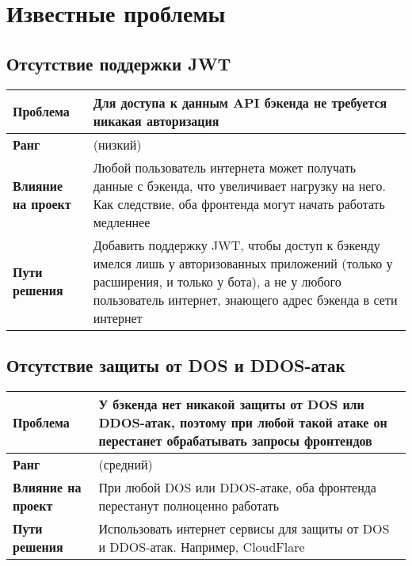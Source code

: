 \chapter{Известные проблемы}
	\label{chapter6}

	\section{Отсутствие поддержки JWT}
		\begin{tabularx}{\textwidth}{
				| >{\centering\arraybackslash\hsize=4cm}X
				| >{\centering\arraybackslash}X
				|}
			\hline
			\textbf{Проблема} &  Для доступа к данным API бэкенда не требуется никакая авторизация \\\hline
			\textbf{Ранг} &  3 (низкий) \\\hline
			\textbf{Влияние на проект} &  Любой пользователь интернета может получать данные с бэкенда, что увеличивает нагрузку на него. Как следствие, оба фронтенда могут начать работать медленнее \\\hline
			\textbf{Пути решения} &  Добавить поддержку JWT, чтобы доступ к бэкенду имелся лишь у авторизованных приложений (только у расширения, и только у бота), а не у любого пользователь интернет, знающего адрес бэкенда в сети интернет \\\hline
		\end{tabularx}
	\section{Отсутствие защиты от DOS и DDOS-атак}
		\begin{tabularx}{\textwidth}{
				| >{\centering\arraybackslash\hsize=4cm}X
				| >{\centering\arraybackslash}X
				|}
			\hline
			\textbf{Проблема} &  У бэкенда нет никакой защиты от DOS или DDOS-атак, поэтому при любой такой атаке он перестанет обрабатывать запросы фронтендов \\\hline
			\textbf{Ранг} &  5 (средний) \\\hline
			\textbf{Влияние на проект} &  При любой DOS или DDOS-атаке, оба фронтенда перестанут полноценно работать \\\hline
			\textbf{Пути решения} &  Использовать интернет сервисы для защиты от DOS и DDOS-атак. Например, CloudFlare \\\hline
		\end{tabularx}
